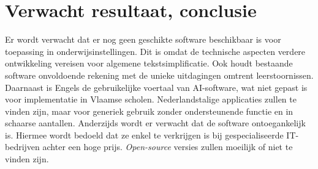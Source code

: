 

\section{Verwacht resultaat, conclusie}%
\label{sec:verwachte_resultaten}

Er wordt verwacht dat er nog geen geschikte software beschikbaar is voor toepassing in onderwijsinstellingen. Dit is omdat de technische aspecten verdere ontwikkeling vereisen voor algemene tekstsimplificatie. Ook houdt bestaande software onvoldoende rekening met de unieke uitdagingen omtrent leerstoornissen. Daarnaast is Engels de gebruikelijke voertaal van AI-software, wat niet gepast is voor implementatie in Vlaamse scholen. Nederlandstalige applicaties zullen te vinden zijn, maar voor generiek gebruik zonder ondersteunende functie en in schaarse aantallen. Anderzijds wordt er verwacht dat de software ontoegankelijk is. Hiermee wordt bedoeld dat ze enkel te verkrijgen is bij gespecialiseerde IT-bedrijven achter een hoge prijs. \emph{Open-source} versies zullen moeilijk of niet te vinden zijn.